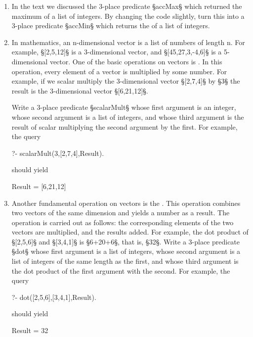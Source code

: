 \begin{enumerate}
\item{}In the text we discussed the 3-place predicate §accMax§
which  returned the maximum of a list of integers.  By changing
the code slightly, turn this into a 3-place predicate §accMin§
which returns the  of a list of integers.
\item{}In mathematics, an n-dimensional vector is a list of numbers of
length n. For example, §[2,5,12]§ is a 3-dimensional vector, and
§[45,27,3,-4,6]§ is a 5-dimensional vector.  One of the basic
operations on vectors is . In this
operation, every element of a vector is multiplied by some number.
For example, if we scalar multiply the 3-dimensional vector
§[2,7,4]§ by §3§ the result is the 3-dimensional vector
§[6,21,12]§.


Write a 3-place predicate §scalarMult§ whose first
argument is an integer, whose second argument is a list of integers,
and whose third argument is the result of scalar multiplying
the second argument by the first. For example, the query
\begin{LPNcodedisplay}
?- scalarMult(3,[2,7,4],Result).
\end{LPNcodedisplay}

should yield
\begin{LPNcodedisplay}
Result = [6,21,12]
\end{LPNcodedisplay}

\item{}Another fundamental operation on vectors is the .  This operation combines two vectors of the same dimension
and yields a number as a result. The operation is carried out as
follows: the corresponding elements of the two vectors are multiplied,
and the results added. For example, the dot product of §[2,5,6]§
and §[3,4,1]§ is §6+20+6§, that is, §32§.  Write a
3-place predicate §dot§ whose first argument is a list of
integers, whose second argument is a list of integers of the same
length as the first, and whose third argument is the dot product of
the first argument with the second.  For example, the query
\begin{LPNcodedisplay}
?- dot([2,5,6],[3,4,1],Result).
\end{LPNcodedisplay}

should yield
\begin{LPNcodedisplay}
Result = 32
\end{LPNcodedisplay}

\end{enumerate}
